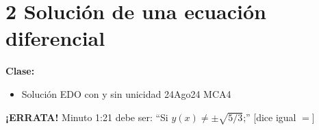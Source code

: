 \section{2 Solución de una ecuación diferencial}

\begin{tcolorbox}[enunciado]
\textbf{Clase:}
\begin{itemize}[leftmargin=*]
    \item Solución EDO con y sin unicidad 24Ago24 MCA4
\end{itemize}
\textbf{¡ERRATA!} Minuto 1:21 debe ser: ``Si $y(x)\ne\pm\sqrt{5/3}$;'' [dice igual $=$]
\end{tcolorbox}


